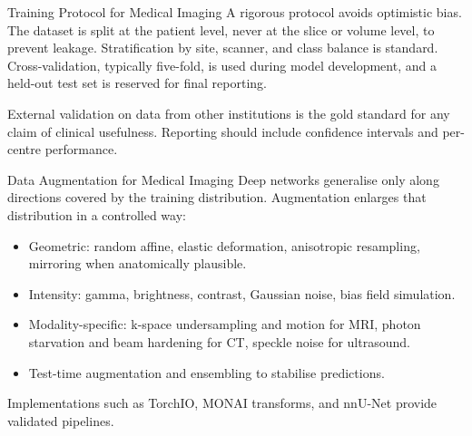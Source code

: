 \begin{frame}{Training Protocol for Medical Imaging}
    A rigorous protocol avoids optimistic bias. The dataset is split at the patient level, never at the slice or volume level, to prevent leakage. Stratification by site, scanner, and class balance is standard. Cross-validation, typically five-fold, is used during model development, and a held-out test set is reserved for final reporting.
    \begin{center}
    \end{center}
    External validation on data from other institutions is the gold standard for any claim of clinical usefulness. Reporting should include confidence intervals and per-centre performance.
\end{frame}

\begin{frame}{Data Augmentation for Medical Imaging}
    Deep networks generalise only along directions covered by the training distribution. Augmentation enlarges that distribution in a controlled way:
    \begin{itemize}
        \item Geometric: random affine, elastic deformation, anisotropic resampling, mirroring when anatomically plausible.
        \item Intensity: gamma, brightness, contrast, Gaussian noise, bias field simulation.
        \item Modality-specific: k-space undersampling and motion for MRI, photon starvation and beam hardening for CT, speckle noise for ultrasound.
        \item Test-time augmentation and ensembling to stabilise predictions.
    \end{itemize}
    Implementations such as TorchIO, MONAI transforms, and nnU-Net provide validated pipelines.
\end{frame}

